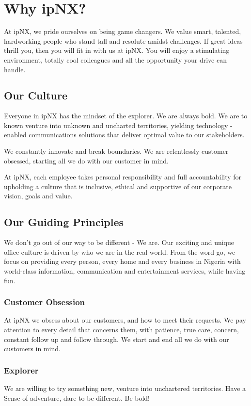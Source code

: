 \section{Why ipNX?}
At ipNX, we pride ourselves on being game changers. We value smart, talented, hardworking people who stand tall and resolute amidst challenges. If great ideas thrill you, then you will fit in with us at ipNX. You will enjoy a stimulating environment, totally cool colleagues and all the opportunity your drive can handle.
\subsection{Our Culture}
Everyone in ipNX has the mindset of the explorer. We are always bold. We are to known venture into unknown and uncharted territories, yielding technology - enabled communications solutions that deliver optimal value to our stakeholders.

We constantly innovate and break boundaries. We are relentlessly customer obsessed, starting all we do with our customer in mind.

At ipNX, each employee takes personal responsibility and full accountability for upholding a culture that is inclusive, ethical and supportive of our corporate vision, goals and value.
\subsection{Our Guiding Principles}
We don't go out of our way to be different - We are. Our exciting and unique office culture is driven by who we are in the real world. From the word go, we focus on providing every person, every home and every business in Nigeria with world-class information, communication and entertainment services, while having fun.
\subsubsection{Customer Obsession} At ipNX we obsess about our customers, and how to meet their requests.  We pay attention to every detail that concerns them, with patience, true care, concern, constant follow up and follow through. We start and end all we do with our customers in mind.
\subsubsection{Explorer} We are willing to try something new, venture into unchartered territories. Have a Sense of adventure, dare  to be different. Be bold!
